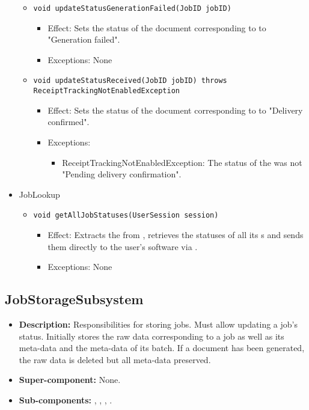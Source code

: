 \begin{itemize}
\begin{itemize}
		\item \texttt{void updateStatusGenerationFailed(JobID jobID)}
		\begin{itemize}
            \item Effect: Sets the status of the document corresponding to  to "Generation failed".
            \item Exceptions: None
        \end{itemize}

		\item \texttt{void updateStatusReceived(JobID jobID) throws ReceiptTrackingNotEnabledException}
		\begin{itemize}
            \item Effect: Sets the status of the document corresponding to  to "Delivery confirmed".
            \item Exceptions:
			\begin{itemize}
				\item ReceiptTrackingNotEnabledException: The status of the  was not "Pending delivery confirmation".
			\end{itemize}
        \end{itemize}
    \end{itemize}

	\item JobLookup
    \begin{itemize}
        \item \texttt{void getAllJobStatuses(UserSession session)}
        \begin{itemize}
            \item Effect: Extracts the  from , retrieves the statuses of all its s and sends them directly to the user's software via .
            \item Exceptions: None
        \end{itemize}
    \end{itemize}
\end{itemize}

\subsection{JobStorageSubsystem}
\begin{itemize}
    \item \textbf{Description:} Responsibilities for storing jobs. Must allow updating a job's status. Initially stores the raw data corresponding to a job as well as its meta-data and the meta-data of its batch. If a document has been generated, the raw data is deleted but all meta-data preserved.
    \item \textbf{Super-component:} None.
    \item \textbf{Sub-components:} , , , .
\end{itemize}

